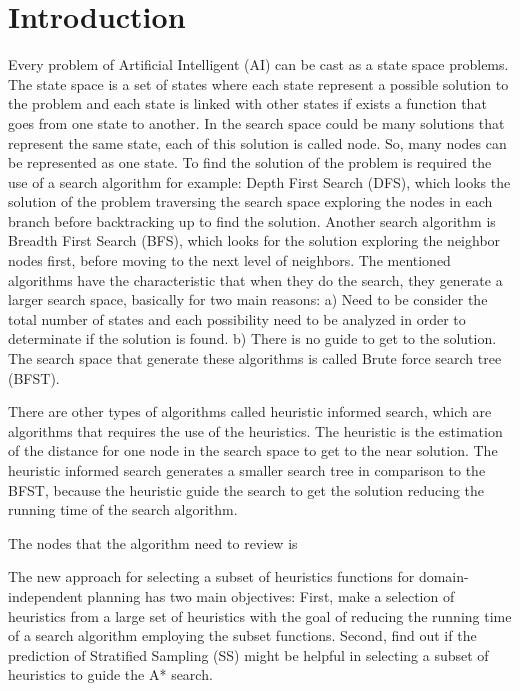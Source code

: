 \documentclass[a4paper,12pt]{article}
\begin{document}
\section{Introduction}
Every problem of Artificial Intelligent (AI) can be cast as a state space problems. The state space is a set of states where each state represent a possible solution to the problem and each state is linked with other states if exists a function that goes from one state to another. In the search space could be many solutions that represent the same state, each of this solution is called node. So, many nodes can be represented as one state. To find the solution of the problem is required the use of a search algorithm for example: Depth First Search (DFS), which looks the solution of the problem traversing the search space exploring the nodes in each branch before backtracking up to find the solution. Another search algorithm is Breadth First Search (BFS), which looks for the solution exploring the neighbor nodes first, before moving to the next level of neighbors. The mentioned algorithms have the characteristic that when they do the search, they generate a larger search space, basically for two main reasons: a) Need to be consider the total number of states and each possibility need to be analyzed in order to determinate if the solution is found. b) There is no guide to get to the solution. The search space that generate these algorithms is called Brute force search tree (BFST).

There are other types of algorithms called heuristic informed search, which are algorithms that requires the use of the heuristics. The heuristic is the estimation of the distance for one node in the search space to get to the near solution. The heuristic informed search generates a smaller search tree in comparison to the BFST, because the heuristic guide the search to get the solution reducing the running time of the search algorithm.
  
  

The nodes that the algorithm need to review is 



The new approach for selecting a subset of heuristics functions for domain-independent planning has two main objectives: First, make a selection of heuristics from a large set of heuristics with the goal of reducing the running time of a search algorithm employing the subset functions. Second, find out if the prediction of Stratified Sampling (SS) might be helpful in selecting a subset of heuristics to guide the A* search.
\end{document}
